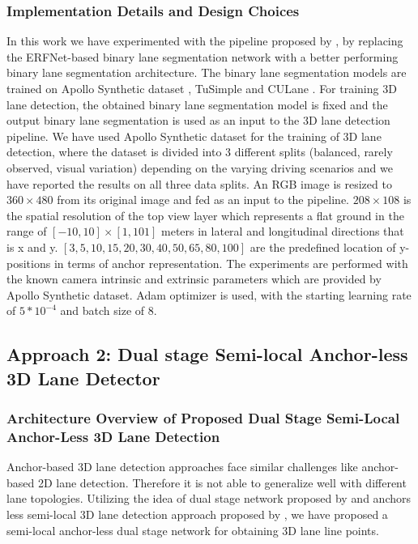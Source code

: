             \subsubsection{Implementation Details and Design Choices}
            In this work we have experimented with the pipeline proposed by \cite{Guo_2018_ECCV}, by replacing the ERFNet-based \cite{Romera2018ERFNetER}  binary lane segmentation network with a better performing binary lane segmentation architecture. The binary lane segmentation models are trained on Apollo Synthetic dataset \cite{guo2020gen}, TuSimple \cite{Tusimple} and CULane \cite{pan2018SCNN}. For training 3D lane detection, the obtained binary lane segmentation model is fixed and the output binary lane segmentation is used as an input to the 3D lane detection pipeline. We have used Apollo Synthetic dataset \cite{Guo_2018_ECCV} for the training of 3D lane detection, where the dataset is divided into 3 different splits (balanced, rarely observed, visual variation) depending on the varying driving scenarios and we have reported the results on all three data splits. An RGB image is resized to $360 \times 480$ from its original image and fed as an input to the pipeline. $208 \times 108$ is the spatial resolution of the top view layer which represents a flat ground in the range of $[-10, 10] \times [1 , 101]$ meters in lateral and longitudinal directions that is x and y. $[3, 5, 10, 15, 20, 30, 40, 50, 65, 80, 100]$ are the predefined location of y-positions in terms of anchor representation. The experiments are performed with the known camera intrinsic and extrinsic parameters which are provided by Apollo Synthetic dataset\cite{guo2020gen}. Adam optimizer is used, with the starting learning rate of $5*10^{-4}$ and batch size of 8. 
            
        \subsection{Approach 2: Dual stage Semi-local Anchor-less 3D Lane Detector}
        
        \subsubsection{Architecture Overview of Proposed Dual Stage Semi-Local Anchor-Less 3D Lane Detection}
        
        Anchor-based 3D lane detection approaches face similar challenges like anchor-based 2D lane detection. Therefore it is not able to generalize well with different lane topologies. Utilizing the idea of dual stage network proposed by \cite{guo2020gen} and anchors less semi-local 3D lane detection approach proposed by \cite{DBLP:journals/corr/abs-2011-01535}, we have proposed a semi-local anchor-less dual stage network for obtaining 3D lane line points.
        
